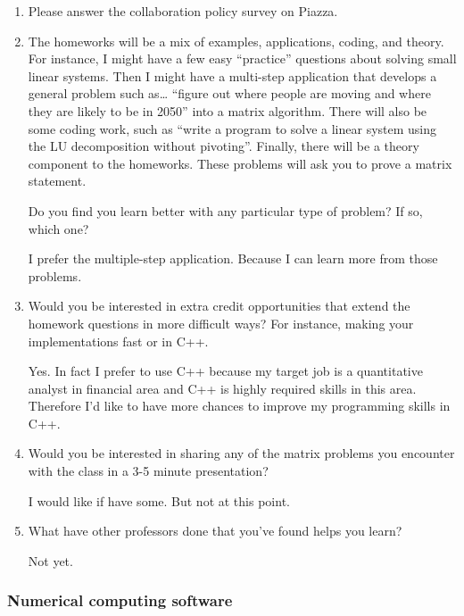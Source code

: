 \documentclass{article}
\begin{document}
\begin{enumerate}%
\item Please answer the collaboration policy survey on Piazza.


\item The homeworks will be a mix of examples, applications, coding, and theory. For instance, I might have a few easy ``{}practice''{} questions about solving small linear systems. Then I might have a multi-step application that develops a general problem such as\ldots{} ``{}figure out where people are moving and where they are likely to be in 2050''{} into a matrix algorithm. There will also be some coding work, such as ``{}write a program to solve a linear system using the LU decomposition without pivoting''{}. Finally, there will be a theory component to the homeworks. These problems will ask you to prove a matrix statement.

Do you find you learn better with any particular type of problem? If so, which one?

I prefer the multiple-step application. Because I can learn more from those problems. 

\item Would you be interested in extra credit opportunities that extend the homework questions in more difficult ways? For instance, making your implementations fast or in C++.

Yes.  In fact I prefer to use C++ because my target job is a quantitative analyst in financial area and C++ is highly required skills in this area.  Therefore I'd like to have more chances to improve my programming skills in C++. 



\item Would you be interested in sharing any of the matrix problems you encounter with the class in a 3-5 minute presentation?

I would like if have some. But not at this point. 


\item What have other professors done that you'{}ve found helps you learn?

Not yet. 


\end{enumerate}
\hypertarget{numerical_computing_software_3}{}\subsubsection*{{Numerical computing software}}\label{numerical_computing_software_3}
\end{document}
